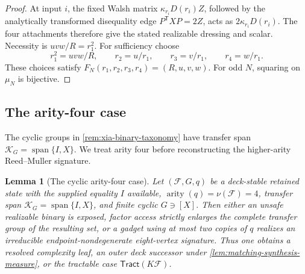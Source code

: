 \documentclass[11pt,letterpaper,onecolumn]{article}
\theoremstyle{plain}
\newtheorem{lemma}[lemma]{Lemma}
\theoremstyle{definition}
\theoremstyle{remark}
\newcommand{\cF}{\mathcal F}
\newcommand{\Tract}{\mathsf{Tract}}
\newcommand{\Span}{\operatorname{span}}
\newcommand{\arity}{\operatorname{arity}}
\begin{document}
\begin{proof}
At input \(i\), the fixed Walsh matrix
\(\kappa_{r_i}D(r_i)Z\), followed by the analytically transformed disequality edge \(P^{\mathsf T}XP=2Z\), acts as
\(2\kappa_{r_i}D(r_i)\).  The four attachments therefore give the stated
realizable dressing and scalar.  Necessity is
\(uvw/R=r_1^2\). For sufficiency choose
\[
  r_1^2=uvw/R,
  \qquad
  r_2=u/r_1,
  \qquad
  r_3=v/r_1,
  \qquad
  r_4=w/r_1.
\]
These choices satisfy
\(F_N(r_1,r_2,r_3,r_4)=(R,u,v,w)\). For odd \(N\), squaring on
\(\mu_N\) is bijective.
\end{proof}

\subsection{The arity-four case}

The cyclic groups in \cref{rem:xia-binary-taxonomy} have transfer span
\(\mathscr K_G=\Span\{I,X\}\). We treat arity four before reconstructing
the higher-arity Reed--Muller signature.

\begin{lemma}[The cyclic arity-four case]
\label{lem:proper-cyclic-q4}
Let \((\cF,G,q)\) be a deck-stable retained state with
the supplied equality \(I\) available,
\(\arity(q)=\nu(\cF)=4\), transfer span \(\mathscr K_G=\Span\{I,X\}\), and finite cyclic \(G\ni[X]\).  Then either an
unsafe realizable binary is exposed, factor access strictly enlarges the
complete transfer group of the resulting set, or a gadget using at most two copies of
\(q\) realizes an irreducible endpoint-nondegenerate eight-vertex signature.  Thus one obtains a resolved complexity leaf, an outer deck successor
under \cref{lem:matching-synthesis-measure}, or the tractable case
\(\Tract(K\cF)\).
\end{lemma}
\end{document}
